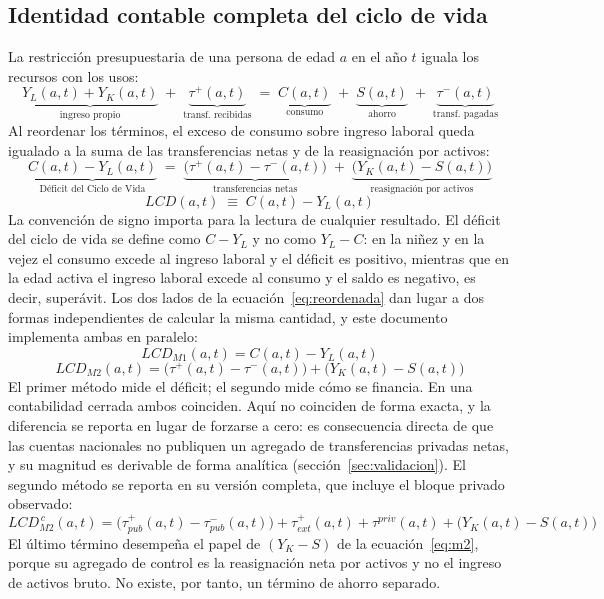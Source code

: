 \documentclass[11pt,a4paper]{article}
\begin{document}
\subsection{Identidad contable completa del ciclo de vida}
\label{sec:identidad}
La restricción presupuestaria de una persona de edad $a$ en el año $t$ iguala los recursos con
los usos:
\begin{equation}
\label{eq:presupuesto}
\underbrace{Y_L(a,t) + Y_K(a,t)}_{\text{ingreso propio}} \;+\;
\underbrace{\tau^{+}(a,t)}_{\text{transf. recibidas}}
\;=\;
\underbrace{C(a,t)}_{\text{consumo}} \;+\; \underbrace{S(a,t)}_{\text{ahorro}} \;+\;
\underbrace{\tau^{-}(a,t)}_{\text{transf. pagadas}}
\end{equation}
Al reordenar los términos, el exceso de consumo sobre ingreso laboral queda igualado a la suma
de las transferencias netas y de la reasignación por activos:
\begin{equation}
\label{eq:reordenada}
\underbrace{C(a,t) - Y_L(a,t)}_{\text{Déficit del Ciclo de Vida}}
\;=\;
\underbrace{\big(\tau^{+}(a,t) - \tau^{-}(a,t)\big)}_{\text{transferencias netas}}
\;+\;
\underbrace{\big(Y_K(a,t) - S(a,t)\big)}_{\text{reasignación por activos}}
\end{equation}
\begin{equation}
\label{eq:lcd}
LCD(a,t) \;\equiv\; C(a,t) - Y_L(a,t)
\end{equation}
La convención de signo importa para la lectura de cualquier resultado. El déficit del ciclo de
vida se define como $C - Y_L$ y no como $Y_L - C$: en la niñez y en la vejez el consumo excede al
ingreso laboral y el déficit es positivo, mientras que en la edad activa el ingreso laboral
excede al consumo y el saldo es negativo, es decir, superávit.
Los dos lados de la ecuación~\eqref{eq:reordenada} dan lugar a dos formas independientes de
calcular la misma cantidad, y este documento implementa ambas en paralelo:
\begin{equation}
\label{eq:m1}
LCD_{M1}(a,t) = C(a,t) - Y_L(a,t)
\end{equation}
\begin{equation}
\label{eq:m2}
LCD_{M2}(a,t) = \big(\tau^{+}(a,t) - \tau^{-}(a,t)\big) + \big(Y_K(a,t) - S(a,t)\big)
\end{equation}
El primer método mide el déficit; el segundo mide cómo se financia. En una contabilidad cerrada
ambos coinciden. Aquí no coinciden de forma exacta, y la diferencia se reporta en lugar de
forzarse a cero: es consecuencia directa de que las cuentas nacionales no publiquen un agregado
de transferencias privadas netas, y su magnitud es derivable de forma analítica
(sección~\ref{sec:validacion}). El segundo método se reporta en su versión completa, que incluye
el bloque privado observado:
\begin{equation}
\label{eq:m2full}
LCD^{\,c}_{M2}(a,t) = \big(\tau^{+}_{pub}(a,t) - \tau^{-}_{pub}(a,t)\big)
+ \tau^{+}_{ext}(a,t) + \tau^{priv}(a,t) + \big(Y_K(a,t) - S(a,t)\big)
\end{equation}
El último término desempeña el papel de $(Y_K - S)$ de la ecuación~\eqref{eq:m2}, porque su
agregado de control es la reasignación neta por activos y no el ingreso de activos bruto. No
existe, por tanto, un término de ahorro separado.
\end{document}
